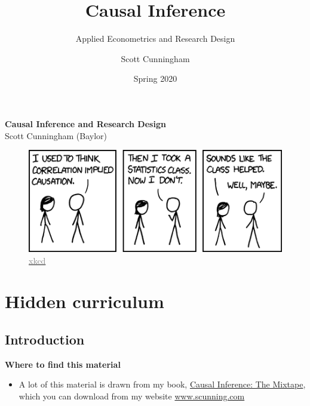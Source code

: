 \documentclass[notes=show]{beamer}
\newcommand{\myurlshort}[2]{\href{#1}{\textcolor{gray}{\textsf{#2}}}}
\begin{document}
\begin{frame}[plain]

	\begin{center}
	\textbf{Causal Inference and Research Design}  \\  Scott Cunningham (Baylor) 
	\end{center}
	
	\begin{figure}
	\includegraphics[scale=0.5]{./lecture_includes/correlation.png}
	\caption{\myurlshort{http://xkcd.com/552/}{xkcd}}
	\end{figure}

\end{frame}


\title[Causal Inference]{Causal Inference} \subtitle{Applied Econometrics and Research Design}
\author[Cunningham]{Scott Cunningham} 
\date[Spring 2020]{Spring 2020}




\section{Hidden curriculum}

\subsection{Introduction}

\begin{frame}
\begin{center}
\textbf{Where to find this material}
\end{center}

\begin{itemize}
	\item A lot of this material is drawn from my book, \underline{Causal Inference: The Mixtape}, which you can download from my website \url{www.scunning.com} 
\end{itemize}
\end{frame}
\end{document}
